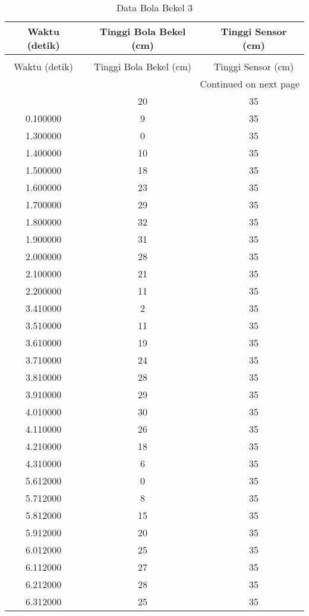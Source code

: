 \begin{longtable}[htbp]{|c|c|c|}
\caption{Data Bola Bekel 3} \\
\hline
Waktu (detik) & Tinggi Bola Bekel (cm) & Tinggi Sensor (cm) \\ \hline
\endfirsthead
\caption[]{Data Bola Bekel 3} \\
\hline
Waktu (detik) & Tinggi Bola Bekel (cm) & Tinggi Sensor (cm) \\ \hline
\endhead
\multicolumn{3}{r}{Continued on next page} \\
\endfoot
\endlastfoot
0.646137 & 20 & 35 \\ \hline
0.100000 & 9 & 35 \\ \hline
1.300000 & 0 & 35 \\ \hline
1.400000 & 10 & 35 \\ \hline
1.500000 & 18 & 35 \\ \hline
1.600000 & 23 & 35 \\ \hline
1.700000 & 29 & 35 \\ \hline
1.800000 & 32 & 35 \\ \hline
1.900000 & 31 & 35 \\ \hline
2.000000 & 28 & 35 \\ \hline
2.100000 & 21 & 35 \\ \hline
2.200000 & 11 & 35 \\ \hline
3.410000 & 2 & 35 \\ \hline
3.510000 & 11 & 35 \\ \hline
3.610000 & 19 & 35 \\ \hline
3.710000 & 24 & 35 \\ \hline
3.810000 & 28 & 35 \\ \hline
3.910000 & 29 & 35 \\ \hline
4.010000 & 30 & 35 \\ \hline
4.110000 & 26 & 35 \\ \hline
4.210000 & 18 & 35 \\ \hline
4.310000 & 6 & 35 \\ \hline
5.612000 & 0 & 35 \\ \hline
5.712000 & 8 & 35 \\ \hline
5.812000 & 15 & 35 \\ \hline
5.912000 & 20 & 35 \\ \hline
6.012000 & 25 & 35 \\ \hline
6.112000 & 27 & 35 \\ \hline
6.212000 & 28 & 35 \\ \hline
6.312000 & 25 & 35 \\ \hline

\end{longtable}
